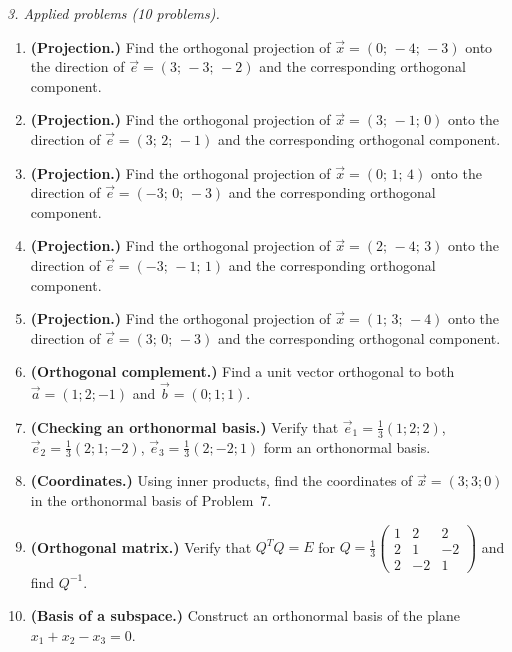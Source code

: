 \emph{3. Applied problems (10 problems).}
\bigskip
\begin{enumerate}[label=\arabic*., leftmargin=*]
\item \textbf{(Projection.)} Find the orthogonal projection of $\vec x=(0;\,-4;\,-3)$ onto the direction of $\vec e=(3;\,-3;\,-2)$ and the corresponding orthogonal component.
\item \textbf{(Projection.)} Find the orthogonal projection of $\vec x=(3;\,-1;\,0)$ onto the direction of $\vec e=(3;\,2;\,-1)$ and the corresponding orthogonal component.
\item \textbf{(Projection.)} Find the orthogonal projection of $\vec x=(0;\,1;\,4)$ onto the direction of $\vec e=(-3;\,0;\,-3)$ and the corresponding orthogonal component.
\item \textbf{(Projection.)} Find the orthogonal projection of $\vec x=(2;\,-4;\,3)$ onto the direction of $\vec e=(-3;\,-1;\,1)$ and the corresponding orthogonal component.
\item \textbf{(Projection.)} Find the orthogonal projection of $\vec x=(1;\,3;\,-4)$ onto the direction of $\vec e=(3;\,0;\,-3)$ and the corresponding orthogonal component.
\item \textbf{(Orthogonal complement.)} Find a unit vector orthogonal to both $\vec a=(1;2;-1)$ and $\vec b=(0;1;1)$.
\item \textbf{(Checking an orthonormal basis.)} Verify that $\vec e_1=\frac13(1;2;2)$, $\vec e_2=\frac13(2;1;-2)$, $\vec e_3=\frac13(2;-2;1)$ form an orthonormal basis.
\item \textbf{(Coordinates.)} Using inner products, find the coordinates of $\vec x=(3;3;0)$ in the orthonormal basis of Problem~7.
\item \textbf{(Orthogonal matrix.)} Verify that $Q^TQ=E$ for $Q=\frac13\left(\begin{smallmatrix}1&2&2\\2&1&-2\\2&-2&1\end{smallmatrix}\right)$ and find $Q^{-1}$.
\item \textbf{(Basis of a subspace.)} Construct an orthonormal basis of the plane $x_1+x_2-x_3=0$.
\end{enumerate}

